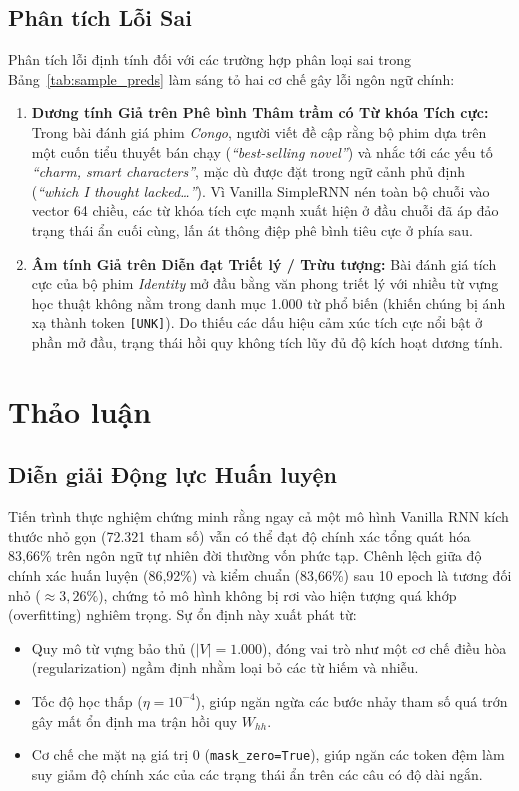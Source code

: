 \documentclass[11pt,a4paper]{article}
\begin{document}
\subsection{Phân tích Lỗi Sai}
Phân tích lỗi định tính đối với các trường hợp phân loại sai trong Bảng~\ref{tab:sample_preds} làm sáng tỏ hai cơ chế gây lỗi ngôn ngữ chính:
\begin{enumerate}
    \item \textbf{Dương tính Giả trên Phê bình Thâm trầm có Từ khóa Tích cực:} Trong bài đánh giá phim \textit{Congo}, người viết đề cập rằng bộ phim dựa trên một cuốn tiểu thuyết bán chạy (\textit{``best-selling novel''}) và nhắc tới các yếu tố \textit{``charm, smart characters''}, mặc dù được đặt trong ngữ cảnh phủ định (\textit{``which I thought lacked\dots''}). Vì Vanilla SimpleRNN nén toàn bộ chuỗi vào vector 64 chiều, các từ khóa tích cực mạnh xuất hiện ở đầu chuỗi đã áp đảo trạng thái ẩn cuối cùng, lấn át thông điệp phê bình tiêu cực ở phía sau.
    \item \textbf{Âm tính Giả trên Diễn đạt Triết lý / Trừu tượng:} Bài đánh giá tích cực của bộ phim \textit{Identity} mở đầu bằng văn phong triết lý với nhiều từ vựng học thuật không nằm trong danh mục 1.000 từ phổ biến (khiến chúng bị ánh xạ thành token \texttt{[UNK]}). Do thiếu các dấu hiệu cảm xúc tích cực nổi bật ở phần mở đầu, trạng thái hồi quy không tích lũy đủ độ kích hoạt dương tính.
\end{enumerate}

\section{Thảo luận}
\label{sec:discussion}

\subsection{Diễn giải Động lực Huấn luyện}
Tiến trình thực nghiệm chứng minh rằng ngay cả một mô hình Vanilla RNN kích thước nhỏ gọn (72.321 tham số) vẫn có thể đạt độ chính xác tổng quát hóa 83,66\% trên ngôn ngữ tự nhiên đời thường vốn phức tạp. Chênh lệch giữa độ chính xác huấn luyện (86,92\%) và kiểm chuẩn (83,66\%) sau 10 epoch là tương đối nhỏ ($\approx 3,26\%$), chứng tỏ mô hình không bị rơi vào hiện tượng quá khớp (overfitting) nghiêm trọng. Sự ổn định này xuất phát từ:
\begin{itemize}
    \item Quy mô từ vựng bảo thủ ($|V| = 1.000$), đóng vai trò như một cơ chế điều hòa (regularization) ngầm định nhằm loại bỏ các từ hiếm và nhiễu.
    \item Tốc độ học thấp ($\eta = 10^{-4}$), giúp ngăn ngừa các bước nhảy tham số quá trớn gây mất ổn định ma trận hồi quy $W_{hh}$.
    \item Cơ chế che mặt nạ giá trị 0 (\texttt{mask\_zero=True}), giúp ngăn các token đệm làm suy giảm độ chính xác của các trạng thái ẩn trên các câu có độ dài ngắn.
\end{itemize}
\end{document}
